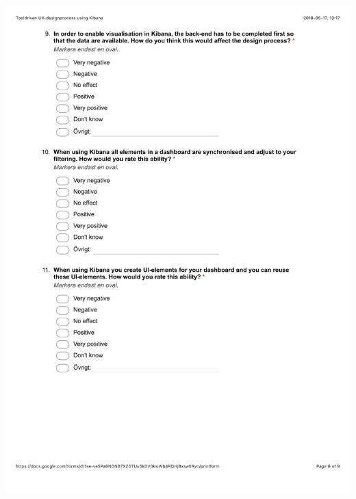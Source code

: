\documentclass[12pt]{kththesis}
\begin{document}
\begin{appendices}
\includegraphics[width=1\textwidth]{UX_designprocess8.pdf}

\end{appendices}
\end{document}
